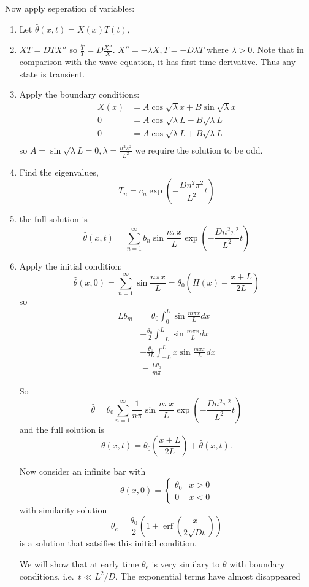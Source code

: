 \documentclass[a4paper]{article}
\DeclareMathOperator{\erf}{erf}
\begin{document}
Now apply seperation of variables:
\begin{enumerate}
\item Let \(\hat \theta(x, t) = X(x) T(t)\),
\item \(X \dot T = DT X''\) so \(\frac{\dot T}{T} = D \frac{X''}{X}\). \(X'' = -\lambda X, \dot T = -D \lambda T\) where \(\lambda > 0\). Note that in comparison with the wave equation, it has first time derivative. Thus any state is transient.
\item Apply the boundary conditions:
  \begin{align*}
    X(x) &= A\cos\sqrt \lambda x + B \sin \sqrt \lambda x \\
    0 &= A \cos \sqrt \lambda L - B \sqrt \lambda L \\
    0 &= A \cos \sqrt \lambda L + B \sqrt \lambda L \\
  \end{align*}
  so \(A = \sin \sqrt \lambda L = 0, \lambda = \frac{n^2\pi^2}{L^2}\) we require the solution to be odd.
\item Find the eigenvalues,
  \[
    T_n = c_n \exp \left( - \frac{Dn^2\pi^2}{L^2}t \right)
  \]
\item the full solution is
  \[
    \hat \theta(x, t) = \sum_{n=1}^{\infty}b_n \sin \frac{n\pi x}{L} \exp \left( - \frac{Dn^2\pi^2}{L^2}t \right)
  \]
\item Apply the initial condition:
  \[
    \hat \theta(x, 0) = \sum_{n=1}^{\infty} \sin \frac{n\pi x}{L} = \theta_0 \left( H(x) - \frac{x+L}{2L} \right)
  \]
  so
  \begin{align*}
    L b_m &= \theta_0 \int_{0}^{L} \sin \frac{m\pi x}{L} dx \\
    &- \frac{\theta_0}{2} \int_{-L}^{L} \sin \frac{m\pi x}{L} dx \\
    &- \frac{\theta_0}{2L} \int_{-L}^{L} x\sin \frac{m\pi x}{L} dx \\
           &= \frac{L\theta_0}{m\pi}
  \end{align*}

  So
  \[
    \hat \theta = \theta_0 \sum_{n=1}^{\infty} \frac{1}{n\pi} \sin \frac{n\pi x}{L} \exp \left( - \frac{D n^2\pi^2}{L^2} t \right)
  \]
  and the full solution is
  \[
    \theta(x, t) = \theta_0 \left( \frac{x+L}{2L} \right) + \hat \theta(x, t).
  \]

  Now consider an infinite bar with
  \[
    \theta(x, 0) =
    \begin{cases}
      \theta_0 & x > 0 \\
      0 & x < 0
    \end{cases}
  \]
  with similarity solution
  \[
    \theta_e = \frac{\theta_0}{2} \left( 1 + \erf\left( \frac{x}{2\sqrt{Dt}} \right) \right)
  \]
  is a solution that satsifies this initial condition.

  We will show that at early time \(\theta_e\) is very similary to \(\theta\) with boundary conditions, i.e.\ \(t \ll L^2/D\). The exponential terms have almost disappeared
\end{enumerate}
\end{document}
